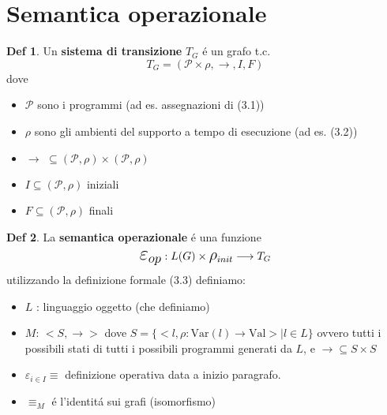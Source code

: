 \documentclass[a4paper]{report}
\newcommand{\prop}{\mathcal{P}}
\theoremstyle{definition} \newtheorem*{defi}{Def}
\theoremstyle{plain} \newtheorem{lemma}{Lemma}
\theoremstyle{plain} \newtheorem{teo}{Teorema}
\theoremstyle{remark} \newtheorem*{es}{Esempio}
\begin{document}
\section{Semantica operazionale}
\begin{defi}
	Un {\bf sistema di transizione} $T_G$ \'e un grafo t.c.
	$$
	T_G = ( \prop \times \rho , \longrightarrow , I , F  )
	$$
	dove
	\begin{itemize}
		\item $\prop$ sono i programmi (ad es. assegnazioni di (3.1))
		\item $\rho$ sono gli ambienti del supporto a tempo di esecuzione (ad es. (3.2))
		\item $ \longrightarrow \, \, \subseteq ( \prop , \rho ) \times ( \prop , \rho ) $
		\item $ I \subseteq ( \prop,\rho)$ iniziali
		\item $ F \subseteq (\prop, \rho)$ finali
	\end{itemize}
\end{defi}
\begin{defi}
	La {\bf semantica operazionale} \'e una funzione
	$$
	\mathlarger{\mathlarger{\mathlarger{\varepsilon_{op}}}} : L(G) \times \mathlarger{\mathlarger{\rho}}_{init} \longrightarrow T_G
	$$
	utilizzando la definizione formale (3.3) definiamo:
	\begin{itemize}
		\item $L$ : linguaggio oggetto (che definiamo)
		\item $M$: $<S, \longrightarrow>$ dove $S = \{ <l, \rho : \mathrm{Var}(l)\longrightarrow\mathrm{Val} >| l\in L\}$ ovvero tutti i possibili stati di tutti i possibili programmi generati da $L$, e $\longrightarrow \subseteq S \times S$
		\item $\varepsilon_{i \in I} \equiv $ definizione operativa data a inizio paragrafo.
		\item $\equiv_M$ \'e l'identit\'a sui grafi (isomorfismo)
	\end{itemize}
\end{defi}
\end{document}
